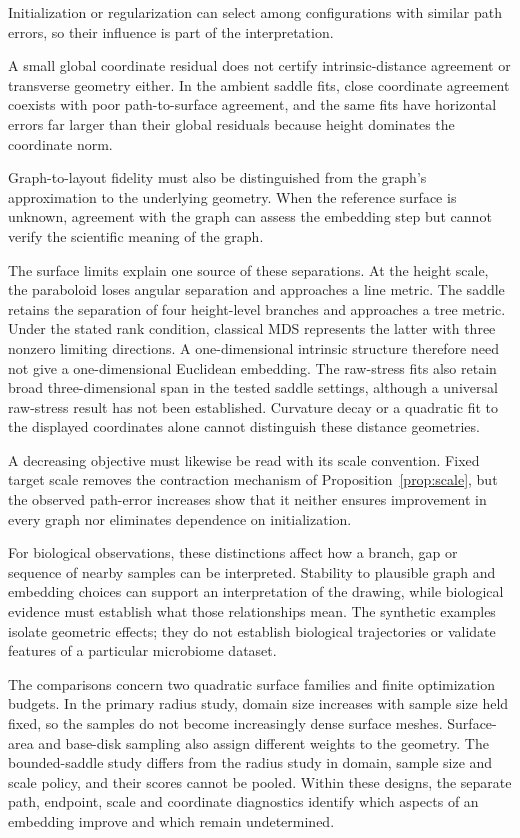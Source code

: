 \documentclass[11pt]{article}
\begin{document}
Initialization or regularization can select among configurations
with similar path errors, so their influence is part of the interpretation.

A small global coordinate residual does not certify intrinsic-distance
agreement or transverse geometry either. In the ambient saddle fits, close
coordinate agreement coexists with poor path-to-surface agreement, and the
same fits have horizontal errors far larger than their global residuals
because height dominates the coordinate norm.

Graph-to-layout fidelity must also be distinguished from the graph's
approximation to the underlying geometry. When the reference surface is
unknown, agreement with the graph can assess the embedding step but cannot
verify the scientific meaning of the graph.

The surface limits explain one source of these separations. At the height
scale, the paraboloid loses angular separation and approaches a line metric.
The saddle retains the separation of four height-level branches and
approaches a tree metric. Under the stated rank condition, classical MDS
represents the latter with three nonzero limiting directions. A
one-dimensional intrinsic structure therefore need not give a one-dimensional
Euclidean embedding. The raw-stress fits also retain broad three-dimensional
span in the tested saddle settings, although a universal raw-stress result
has not been established. Curvature decay or a quadratic fit to the displayed
coordinates alone cannot distinguish these distance geometries.

A decreasing objective must likewise be read with its scale convention.
Fixed target scale removes the contraction mechanism of
Proposition~\ref{prop:scale}, but the observed path-error increases show that
it neither ensures improvement in every graph nor eliminates dependence on
initialization.

For biological observations, these distinctions affect how a branch, gap or
sequence of nearby samples can be interpreted. Stability to plausible graph
and embedding choices can support an interpretation of the drawing, while
biological evidence must establish what those relationships mean. The
synthetic examples isolate geometric effects; they do not establish
biological trajectories or validate features of a particular microbiome
dataset.

The comparisons concern two quadratic surface families and finite
optimization budgets. In the primary radius study, domain size increases
with sample size held fixed, so the samples do not become increasingly dense
surface meshes. Surface-area and base-disk sampling also assign different
weights to the geometry. The bounded-saddle study differs from the radius
study in domain, sample size and scale policy, and their scores cannot be
pooled. Within these designs, the separate path, endpoint, scale and
coordinate diagnostics identify which aspects of an embedding improve and
which remain undetermined.
\end{document}
